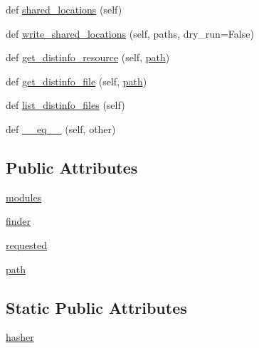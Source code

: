 \begin{DoxyCompactItemize}
\item 
def \hyperlink{classpip_1_1__vendor_1_1distlib_1_1database_1_1InstalledDistribution_acb9d762b10d0e0269e958d3f89307d10}{shared\+\_\+locations} (self)
\item 
def \hyperlink{classpip_1_1__vendor_1_1distlib_1_1database_1_1InstalledDistribution_af3838a1a36ab26de00c92bfc21c170ab}{write\+\_\+shared\+\_\+locations} (self, paths, dry\+\_\+run=False)
\item 
def \hyperlink{classpip_1_1__vendor_1_1distlib_1_1database_1_1InstalledDistribution_ad84e1afa18adad68245f91f86aed9c17}{get\+\_\+distinfo\+\_\+resource} (self, \hyperlink{classpip_1_1__vendor_1_1distlib_1_1database_1_1InstalledDistribution_afb6f35086abe4dde61329963fdb46233}{path})
\item 
def \hyperlink{classpip_1_1__vendor_1_1distlib_1_1database_1_1InstalledDistribution_ac17c694fe33794a2a93c022eae8919fc}{get\+\_\+distinfo\+\_\+file} (self, \hyperlink{classpip_1_1__vendor_1_1distlib_1_1database_1_1InstalledDistribution_afb6f35086abe4dde61329963fdb46233}{path})
\item 
def \hyperlink{classpip_1_1__vendor_1_1distlib_1_1database_1_1InstalledDistribution_a91b6c8c2a299a9b1436538ad0cfe37d7}{list\+\_\+distinfo\+\_\+files} (self)
\item 
def \hyperlink{classpip_1_1__vendor_1_1distlib_1_1database_1_1InstalledDistribution_a9b5ed2b1d9ce082f207e18b06a41d0ff}{\+\_\+\+\_\+eq\+\_\+\+\_\+} (self, other)
\end{DoxyCompactItemize}
\subsection*{Public Attributes}
\begin{DoxyCompactItemize}
\item 
\hyperlink{classpip_1_1__vendor_1_1distlib_1_1database_1_1InstalledDistribution_aa561916edd742d6354e0c02683a9fecb}{modules}
\item 
\hyperlink{classpip_1_1__vendor_1_1distlib_1_1database_1_1InstalledDistribution_ae08b254fe2710b3cbbbfcf4fca5693cd}{finder}
\item 
\hyperlink{classpip_1_1__vendor_1_1distlib_1_1database_1_1InstalledDistribution_ab395d2f66c795820e42602836bc7ebd6}{requested}
\item 
\hyperlink{classpip_1_1__vendor_1_1distlib_1_1database_1_1InstalledDistribution_afb6f35086abe4dde61329963fdb46233}{path}
\end{DoxyCompactItemize}
\subsection*{Static Public Attributes}
\begin{DoxyCompactItemize}
\item 
\hyperlink{classpip_1_1__vendor_1_1distlib_1_1database_1_1InstalledDistribution_a8e62a2e69a6d9630600baa98962a3114}{hasher}
\end{DoxyCompactItemize}


